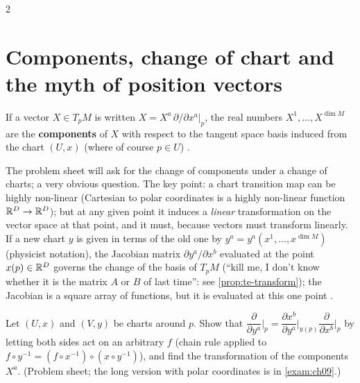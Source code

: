 \begin{paracol}{2}
\section{Components, change of chart and the myth of position vectors}\label{sec:tv-components}

\begin{definition}\label{def:tv-components}
If a vector $X\in T_pM$ is written $X=X^a\,\partial/\partial x^a|_p$, the real numbers $X^1,\dots,X^{\dim M}$ are the \textbf{components} of $X$ with respect to the tangent space basis induced from the chart $(U,x)$ (where of course $p\in U$)     .
\end{definition}
The problem sheet will ask for the change of components under a change of charts; a very obvious question. The key point: a chart transition map can be highly non-linear (Cartesian to polar coordinates is a highly non-linear function $\mathbb{R}^D\to\mathbb{R}^D$); but at any given point it induces a \emph{linear} transformation on the
vector space at that point, and it must, because vectors must transform linearly. If a new chart $y$ is given in terms of the old one by $y^a=y^a(x^1,\dots,x^{\dim M})$ (physicist notation), the Jacobian matrix $\partial y^a/\partial x^b$ evaluated at the point $x(p)\in\mathbb{R}^D$ governs the change of the basis of $T_pM$ (``kill me, I don't know whether it is the matrix $A$ or
$B$ of last time'': see \cref{prop:te-transform}); the Jacobian is a square array of functions, but it is evaluated at this one point      .
\begin{exercise}\label{ex:tv-change}
Let $(U,x)$ and $(V,y)$ be charts around $p$. Show that $\dfrac{\partial}{\partial y^a}\Big|_p=\dfrac{\partial x^b}{\partial y^a}\Big|_{y(p)}\dfrac{\partial}{\partial x^b}\Big|_p$ by letting both sides act on an arbitrary $f$ (chain rule applied to $f\circ y^{-1}=(f\circ x^{-1})\circ(x\circ y^{-1})$), and find the transformation of the components $X^a$.
(Problem sheet; the long version with polar coordinates is in \cref{exam:ch09}.)
\end{exercise}


\end{paracol}
